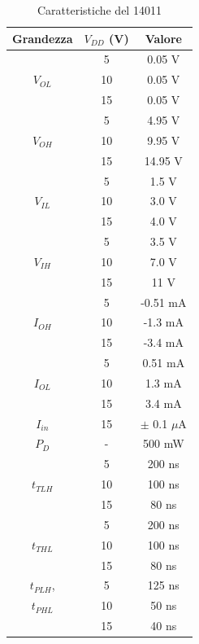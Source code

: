 \documentclass[journal, a4paper]{IEEEtran}
\begin{document}
\begin{table}
\centering
\caption{Caratteristiche del 14011}
\label{tab:data}
\begin{tabular}{|c|c|c|}
  \hline
  Grandezza & $V_{DD}$ (V)& Valore \\
  \hline
           &  5  &  0.05 V \\ \cline{2-3}
  $V_{OL}$ & 10  &  0.05 V \\ \cline{2-3}
           & 15  &  0.05 V \\ 
  \hline 
           &  5  &  4.95 V \\ \cline{2-3}
  $V_{OH}$ & 10  &  9.95 V \\ \cline{2-3}
           & 15  & 14.95 V \\ 
  \hline \hline
           &  5  &  1.5 V \\ \cline{2-3}
  $V_{IL}$ & 10  &  3.0 V \\ \cline{2-3}
           & 15  &  4.0 V \\ 
  \hline 
           &  5  &  3.5 V \\ \cline{2-3}
  $V_{IH}$ & 10  &  7.0 V \\ \cline{2-3}
           & 15  &   11 V \\ 
  \hline \hline
           &  5  &  -0.51 mA \\ \cline{2-3}
  $I_{OH}$ & 10  &  -1.3  mA \\ \cline{2-3}
           & 15  &  -3.4  mA \\ 
  \hline 
           &  5  &  0.51 mA \\ \cline{2-3}
  $I_{OL}$ & 10  &  1.3  mA \\ \cline{2-3}
           & 15  &  3.4  mA \\
  \hline \hline
  $I_{in}$ & 15  &  $\pm$ 0.1 $\mu$A\\
  \hline \hline
  $P_D$    & -   &  500 mW\\
  \hline \hline
            &  5  &  200  ns \\ \cline{2-3}
  $t_{TLH}$ & 10  &  100  ns \\ \cline{2-3}
            & 15  &   80  ns \\
  \hline 
            &  5  &  200  ns \\ \cline{2-3}
  $t_{THL}$ & 10  &  100  ns \\ \cline{2-3}
            & 15  &   80  ns \\
  \hline
  $t_{PLH}$, &  5  &  125  ns \\ \cline{2-3}
  $t_{PHL}$  & 10  &   50  ns \\ \cline{2-3}
             & 15  &   40  ns \\
  \hline
\end{tabular}
\end{table}
\end{document}
